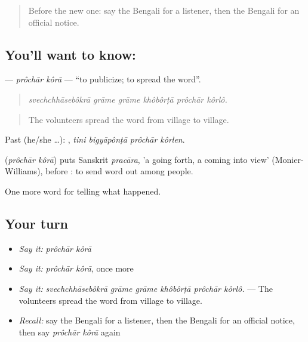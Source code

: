 \label{lesson:BN-C300-prochar-kora}



\begin{quote}
Before the new one: say the Bengali for a listener, then the Bengali for an official notice.
\end{quote}

\subsection*{You'll want to know:  }
\textbf{ } — \emph{prôchār kôrā} — \textquotedblleft{}to publicize; to spread the word\textquotedblright{}.

\begin{quote}
     
\end{quote}

\begin{quote}
\emph{svechchhāsebôkrā grāme grāme khôbôrṭā prôchār kôrlô.}
\end{quote}

\begin{quote}
The volunteers spread the word from village to village.
\end{quote}

Past (he/she …):    , \emph{tini bigyāpônṭā prôchār kôrlen}.

\begin{cousinweb}
\textbf{ } (\emph{prôchār kôrā}) puts Sanskrit \emph{pracāra}, 'a going forth, a coming into view' (Monier-Williams), before : to send word out among people.
\end{cousinweb}

\begin{grammarlens}[title={What you've built}]
One more word for telling what happened.
\end{grammarlens}

\subsection*{Your turn}
\begin{itemize}
\raggedright
  \item \emph{Say it:} \emph{prôchār kôrā}
  \item \emph{Say it:} \emph{prôchār kôrā}, once more
  \item \emph{Say it:} \emph{svechchhāsebôkrā grāme grāme khôbôrṭā prôchār kôrlô.} — The volunteers spread the word from village to village.
  \item \emph{Recall:} say the Bengali for a listener, then the Bengali for an official notice, then say \emph{prôchār kôrā} again
\end{itemize}


